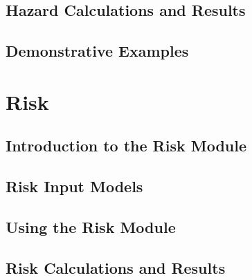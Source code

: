 \documentclass[11pt,fleqn]{book} %
\begin{document}
\chapter{Hazard Calculations and Results}
	\label{chap:hazoutputs}
	
   \cleardoublepage

\chapter{Demonstrative Examples}
	\label{chap:hazdemos}
	
   \cleardoublepage

\thispagestyle{empty}
\part{Risk}

\chapter{Introduction to the Risk Module}
   \label{chap:riskintro}
	
   \cleardoublepage

\chapter{Risk Input Models}
   \label{chap:riskinputs}
   
   \cleardoublepage

\chapter{Using the Risk Module}
	\label{chap:riskcalculators}
	
   \cleardoublepage

\chapter{Risk Calculations and Results}
	\label{chap:riskoutputs}
	
   \cleardoublepage

\end{document}
